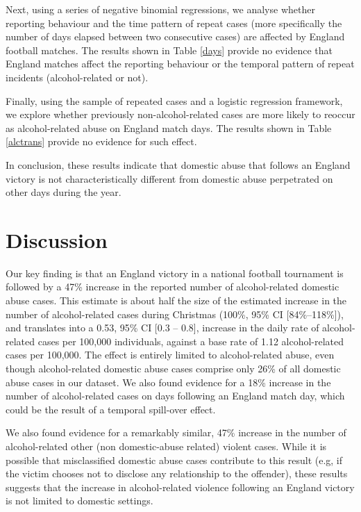 \documentclass[12pt, a4paper]{article}
\begin{document}
Next, using a series of negative binomial regressions, we analyse whether reporting behaviour and the time pattern of repeat cases (more specifically the number of days elapsed between two consecutive cases) are affected by England football matches. The results shown in Table \ref{days} provide no evidence that England matches affect the reporting behaviour or the temporal pattern of repeat incidents (alcohol-related or not).




Finally, using the sample of repeated cases and a logistic regression framework, we explore whether previously non-alcohol-related cases are more likely to reoccur as alcohol-related abuse on England match days. The results shown in Table \ref{alctrans} provide no evidence for such effect. 

In conclusion, these results indicate that domestic abuse that follows an England victory is not characteristically different from domestic abuse perpetrated on other days during the year.

\clearpage

\section*{Discussion}

Our key finding is that an England victory in a national football tournament is followed by a 47\% increase in the reported number of alcohol-related domestic abuse cases. This estimate is about half the size of the estimated increase in the number of alcohol-related cases during Christmas (100\%, 95\% CI [84\%--118\%]), and translates into a 0.53, 95\% CI [0.3 -- 0.8], increase in the daily rate of alcohol-related cases per 100,000 individuals, against a base rate of 1.12 alcohol-related cases per 100,000. The effect is entirely limited to alcohol-related abuse, even though alcohol-related domestic abuse cases comprise only 26\% of all domestic abuse cases in our dataset. We also found evidence for a 18\% increase in the number of alcohol-related cases on days following an England match day, which could be the result of a temporal spill-over effect.


We also found evidence for a remarkably similar, 47\% increase in the number of alcohol-related other (non domestic-abuse related) violent cases. While it is possible that misclassified domestic abuse cases contribute to this result (e.g, if the victim chooses not to disclose any relationship to the offender), these results suggests that the increase in alcohol-related violence following an England victory is not limited to domestic settings. 
\end{document}
